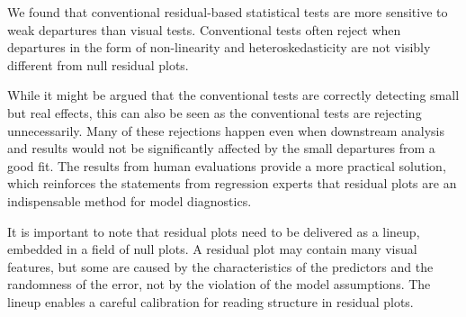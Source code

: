 \documentclass{vgtc}                          %
\begin{document}
We found that conventional residual-based statistical tests are more
sensitive to weak departures than visual tests.
Conventional tests often reject
when departures in the form of non-linearity and heteroskedasticity are
not visibly different from null residual plots.

While it might be argued that the conventional tests are correctly
detecting small but real effects, this can also be seen as the
conventional tests are rejecting unnecessarily. Many of these rejections
happen even when downstream analysis and results would not be
significantly affected by the small departures from a good fit. The
results from human evaluations provide a more practical solution, which
reinforces the statements from regression experts that residual plots
are an indispensable method for model diagnostics.

It is important to note that residual plots need to be delivered as a
lineup, embedded in a field of null plots. A residual plot may contain
many visual features, but some are caused by the characteristics of the
predictors and the randomness of the error, not by the violation of the
model assumptions. The lineup enables a careful calibration for
reading structure in residual plots.


%

%
%
%


\end{document}
